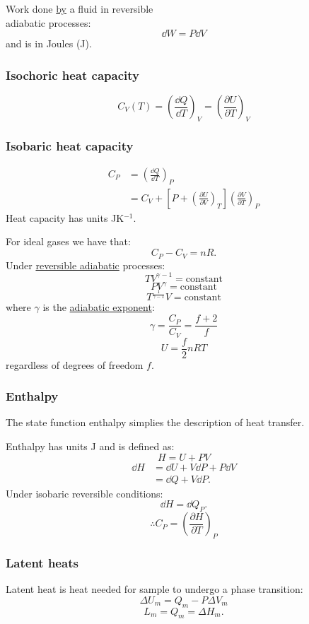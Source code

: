 \documentclass{article}
\begin{document}
\begin{multicols*}{3}
Work done \underline{by} a fluid
in reversible \\
adiabatic processes:
$$\dd W=P\dd V$$
and is in Joules (J).

\subsubsection*{Isochoric heat capacity}
$$C_V(T)=\left(\frac{\dd Q}{\dd T}\right)_V
=\left(\frac{\partial U}{\partial T}\right)_V$$

\subsubsection*{Isobaric heat capacity}
\begin{align*}
    C_P
    &=\left(\frac{\dd Q}{\dd T}\right)_P \\
    &=C_V+\left[P+
    \left(\frac{\partial U}{\partial V}\right)_T\right]
    \left(\frac{\partial V}{\partial T}\right)_P
\end{align*}
Heat capacity has units JK$^{-1}$.

For ideal gases we have that:
$$C_P-C_V=nR.$$
Under \underline{reversible adiabatic} processes:
$$TV^{\gamma-1}=\text{constant}$$
$$PV^{\gamma}=\text{constant}$$
$$T^{\frac{1}{\gamma-1}}V=\text{constant}$$
where $\gamma$ is the \underline{adiabatic exponent}:
$$\gamma=\frac{C_P}{C_V}
=\frac{f+2}{f}$$
$$U=\frac{f}{2}nRT$$
regardless of degrees of freedom $f$.

\subsubsection*{Enthalpy}
The state function enthalpy simplies the
description of heat transfer. 

Enthalpy has units J
and is defined as:
$$H=U+PV$$
\begin{align*}
    \dd H
    &=\dd U+V\dd P+P\dd V \\
    &=\dd Q+V\dd P.
\end{align*}
Under isobaric reversible conditions:
$$\dd H=\dd Q_P.$$
$$\therefore C_P
=\left(\frac{\partial H}{\partial T}\right)_P$$

\subsubsection*{Latent heats}
Latent heat is heat needed for sample
to undergo a phase transition:
$$\Delta U_m=Q_m-P\Delta V_m$$
$$L_m=Q_m=\Delta H_m.$$


\end{multicols*}
\end{document}

